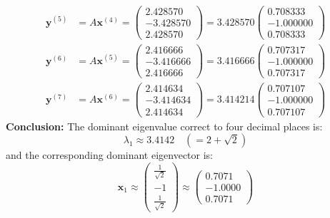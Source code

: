 \begin{align}
    \mathbf{y}^{(5)} &= A \mathbf{x}^{(4)} = \begin{pmatrix} 2.428570 \\ -3.428570 \\ 2.428570 \end{pmatrix} = 3.428570 \begin{pmatrix} 0.708333 \\ -1.000000 \\ 0.708333 \end{pmatrix} \\
    \mathbf{y}^{(6)} &= A \mathbf{x}^{(5)} = \begin{pmatrix} 2.416666 \\ -3.416666 \\ 2.416666 \end{pmatrix} = 3.416666 \begin{pmatrix} 0.707317 \\ -1.000000 \\ 0.707317 \end{pmatrix} \\
    \mathbf{y}^{(7)} &= A \mathbf{x}^{(6)} = \begin{pmatrix} 2.414634 \\ -3.414634 \\ 2.414634 \end{pmatrix} = \mathbf{3.414214} \begin{pmatrix} \mathbf{0.707107} \\ \mathbf{-1.000000} \\ \mathbf{0.707107} \end{pmatrix}
\end{align}
\textbf{Conclusion:}
The dominant eigenvalue correct to four decimal places is:
\begin{equation}
    \boxed{\lambda_1 \approx 3.4142 \quad (= 2 + \sqrt{2})}
\end{equation}
and the corresponding dominant eigenvector is:
\begin{equation}
    \boxed{\mathbf{x}_1 \approx \begin{pmatrix} \frac{1}{\sqrt{2}} \\ -1 \\ \frac{1}{\sqrt{2}} \end{pmatrix} \approx \begin{pmatrix} 0.7071 \\ -1.0000 \\ 0.7071 \end{pmatrix}}
\end{equation}
